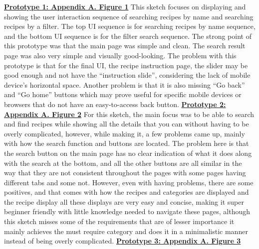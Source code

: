 \documentclass[11pt,english]{article}
\begin{document}
\textbf{\underline{Prototype 1: Appendix A. Figure 1}}
\newline
\newline
This sketch focuses on displaying and showing the user interaction sequence of searching recipes by name and searching recipes by a filter. The top UI sequence is for searching recipes by name sequence, and the bottom UI sequence is for the filter search sequence. The strong point of this prototype was that the main page was simple and clean. The search result page was also very simple and visually good-looking. The problem with this prototype is that for the final UI, the recipe instruction page, the slider may be good enough and not have the “instruction slide”, considering the lack of mobile device’s horizontal space. Another problem is that it is also missing “Go back” and “Go home” buttons which may prove useful for specific mobile devices or browsers that do not have an easy-to-access back button.
\newline
\newline
\textbf{\underline{Prototype 2: Appendix A. Figure 2}}
\newline
\newline
For this sketch, the main focus was to be able to search and find recipes while showing all the details that you can without having to be overly complicated, however, while making it, a few problems came up, mainly with how the search function and buttons are located. The problem here is that the search button on the main page has no clear indication of what it does along with the search at the bottom, and all the other buttons are all similar in the way that they are not consistent throughout the pages with some pages having different tabs and some not. However, even with having problems, there are some positives, and that comes with how the recipes and categories are displayed and the recipe display all these displays are very easy and concise, making it super beginner friendly with little knowledge needed to navigate these pages, although this sketch misses some of the requirements that are of lesser importance it mainly achieves the must require category and does it in a minimalistic manner instead of being overly complicated.
\newline
\newline
\textbf{\underline{Prototype 3: Appendix A. Figure 3}}
\newline
\newline
\end{document}
